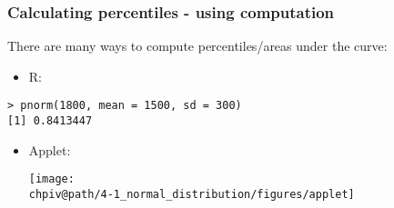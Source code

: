 \documentclass[slidestop,compress,mathserif]{beamer}
\makeatletter
\def\chpiv@path{../../Chp 4}
\makeatother
\begin{document}
\begin{frame}[fragile]
\frametitle{Calculating percentiles - using computation}

There are many ways to compute percentiles/areas under the curve:

\begin{itemize}
\item R:
\end{itemize}
\begin{beamerboxesrounded}[shadow = false, lower = code body]{}
{\small \begin{verbatim}
> pnorm(1800, mean = 1500, sd = 300)
[1] 0.8413447
\end{verbatim}
}
\end{beamerboxesrounded}
\begin{itemize}
\item Applet: {\small {}}
\begin{center}
\texttt{[image: \\chpiv@path/4-1\_normal\_distribution/figures/applet]}
\end{center}

\end{itemize}


\end{frame}

\end{document}
